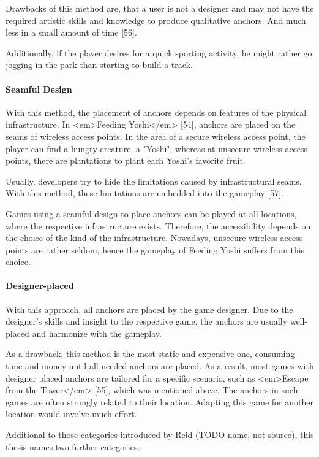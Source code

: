 Drawbacks of this method are, that a user is not a designer and may not have the required artistic skills and knowledge to produce qualitative anchors. And much less in a small amount of time [56].

Additionally, if the player desires for a quick sporting activity, he might rather go jogging in the park than starting to build a track.

\paragraph{Seamful Design}
With this method, the placement of anchors depends on features of the physical infrastructure. In <em>Feeding Yoshi</em> [54], anchors are placed on the seams of wireless access points. In the area of a secure wireless access point, the player can find a hungry creature, a "Yoshi", whereas at unsecure wireless access points, there are plantations to plant each Yoshi’s favorite fruit.

Usually, developers try to hide the limitations caused by infrastructural seams. With this method, these limitations are embedded into the gameplay [57].

Games using a seamful design to place anchors can be played at all locations, where the respective infrastructure exists. Therefore, the accessibility depends on the choice of the kind of the infrastructure. Nowadays, unsecure wireless access points are rather seldom, hence the gameplay of Feeding Yoshi suffers from this choice.

\paragraph{Designer-placed}
With this approach, all anchors are placed by the game designer. Due to the designer’s skills and insight to the respective game, the anchors are usually well-placed and harmonize with the gameplay.

As a drawback, this method is the most static and expensive one, consuming time and money until all needed anchors are placed. As a result, most games with designer placed anchors are tailored for a specific scenario, such as <em>Escape from the Tower</em> [55], which was mentioned above. The anchors in such games are often strongly related to their location. Adapting this game for another location would involve much effort.

Additional to those categories introduced by Reid (TODO name, not source), this thesis names two further categories.

